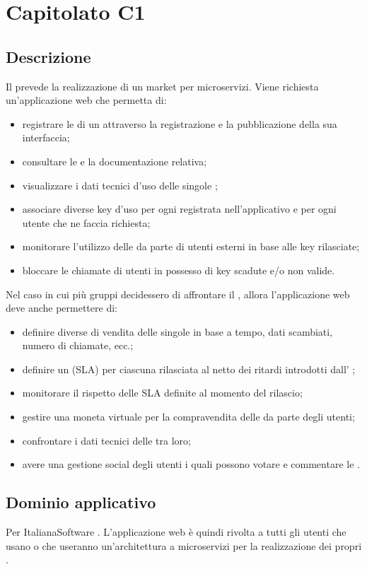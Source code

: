 \section {Capitolato C1}
	\subsection {Descrizione}
		Il  prevede la realizzazione di un  market per microservizi. Viene richiesta un'applicazione web che permetta di:
		\begin {itemize}
			\item registrare le  di un  attraverso la registrazione e la pubblicazione della sua interfaccia;
			\item consultare le  e la documentazione relativa;
			\item visualizzare i dati tecnici d'uso delle singole ;
			\item associare diverse  key d'uso per ogni  registrata nell'applicativo e per ogni utente che ne faccia richiesta;
			\item monitorare l'utilizzo delle  da parte di utenti esterni in base alle  key rilasciate;
			\item bloccare le chiamate di utenti in possesso di  key scadute e/o non valide.
		\end {itemize}
		Nel caso in cui più gruppi decidessero di affrontare il , allora l'applicazione web deve anche permettere di:
		\begin {itemize}
			\item definire diverse  di vendita delle singole  in base a tempo, dati scambiati, numero di chiamate, ecc.;
			\item definire un  (SLA) per ciascuna  rilasciata al netto dei ritardi introdotti dall' ;
			\item monitorare il rispetto delle SLA definite al momento del rilascio;
			\item gestire una moneta virtuale per la compravendita delle  da parte degli utenti;
			\item confrontare i dati tecnici delle  tra loro;
			\item avere una gestione social degli utenti i quali possono votare e commentare le .
		\end {itemize}
	\subsection {Dominio applicativo} 
		Per ItalianaSoftware . L'applicazione web è quindi rivolta a tutti gli utenti che usano o che useranno 
		un'architettura a microservizi per la realizzazione dei propri .
